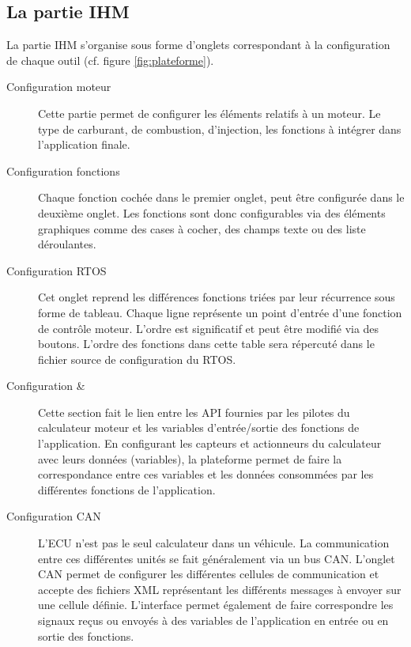 \subsection{La partie IHM}
La partie IHM s'organise sous forme d'onglets correspondant à la configuration de chaque outil (cf. figure \ref{fig:plateforme}). 
\begin{description}
  \item[Configuration moteur] Cette partie permet de configurer les éléments relatifs à un moteur. Le type de carburant, de combustion, d'injection, les fonctions à intégrer dans l'application finale.
  \item[Configuration fonctions] Chaque fonction cochée dans le premier onglet, peut être configurée dans le deuxième onglet. Les fonctions sont donc configurables via des éléments graphiques comme des cases à cocher, des champs texte ou des liste déroulantes.
  \item[Configuration RTOS] Cet onglet reprend les différences fonctions triées par leur récurrence sous forme de tableau. Chaque ligne représente un point d'entrée d'une fonction de contrôle moteur. L'ordre est significatif et peut être modifié via des boutons. L'ordre des fonctions dans cette table sera répercuté dans le fichier source de configuration du RTOS.
  \item[Configuration  \& ] Cette section fait le lien entre les API fournies par les pilotes du calculateur moteur et les variables d'entrée/sortie des fonctions de l'application. En configurant les capteurs et actionneurs du calculateur avec leurs données (variables), la plateforme permet de faire la correspondance entre ces variables et les données consommées par les différentes fonctions de l'application.
  \item[Configuration CAN] L'ECU n'est pas le seul calculateur dans un véhicule. La communication entre ces différentes unités se fait généralement via un bus CAN. L'onglet CAN permet de configurer les différentes cellules de communication et accepte des fichiers XML représentant les différents messages à envoyer sur une cellule définie. L'interface permet également de faire correspondre les signaux reçus ou envoyés à des variables de l'application en entrée ou en sortie des fonctions.
\end{description}

